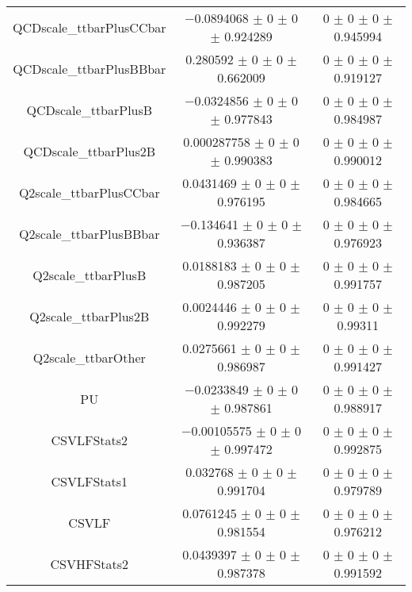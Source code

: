 \begin{table}
\begin{tabular}{ccc}
QCDscale\_ttbarPlusCCbar 	& \num{-0.0894068} $\pm$ \num{0} $\pm$ \num{0} $\pm$ \num{0.924289} 	& \num{0} $\pm$ \num{0} $\pm$ \num{0} $\pm$ \num{0.945994}\\
QCDscale\_ttbarPlusBBbar 	& \num{0.280592} $\pm$ \num{0} $\pm$ \num{0} $\pm$ \num{0.662009} 	& \num{0} $\pm$ \num{0} $\pm$ \num{0} $\pm$ \num{0.919127}\\
QCDscale\_ttbarPlusB 	& \num{-0.0324856} $\pm$ \num{0} $\pm$ \num{0} $\pm$ \num{0.977843} 	& \num{0} $\pm$ \num{0} $\pm$ \num{0} $\pm$ \num{0.984987}\\
QCDscale\_ttbarPlus2B 	& \num{0.000287758} $\pm$ \num{0} $\pm$ \num{0} $\pm$ \num{0.990383} 	& \num{0} $\pm$ \num{0} $\pm$ \num{0} $\pm$ \num{0.990012}\\
Q2scale\_ttbarPlusCCbar 	& \num{0.0431469} $\pm$ \num{0} $\pm$ \num{0} $\pm$ \num{0.976195} 	& \num{0} $\pm$ \num{0} $\pm$ \num{0} $\pm$ \num{0.984665}\\
Q2scale\_ttbarPlusBBbar 	& \num{-0.134641} $\pm$ \num{0} $\pm$ \num{0} $\pm$ \num{0.936387} 	& \num{0} $\pm$ \num{0} $\pm$ \num{0} $\pm$ \num{0.976923}\\
Q2scale\_ttbarPlusB 	& \num{0.0188183} $\pm$ \num{0} $\pm$ \num{0} $\pm$ \num{0.987205} 	& \num{0} $\pm$ \num{0} $\pm$ \num{0} $\pm$ \num{0.991757}\\
Q2scale\_ttbarPlus2B 	& \num{0.0024446} $\pm$ \num{0} $\pm$ \num{0} $\pm$ \num{0.992279} 	& \num{0} $\pm$ \num{0} $\pm$ \num{0} $\pm$ \num{0.99311}\\
Q2scale\_ttbarOther 	& \num{0.0275661} $\pm$ \num{0} $\pm$ \num{0} $\pm$ \num{0.986987} 	& \num{0} $\pm$ \num{0} $\pm$ \num{0} $\pm$ \num{0.991427}\\
PU 	& \num{-0.0233849} $\pm$ \num{0} $\pm$ \num{0} $\pm$ \num{0.987861} 	& \num{0} $\pm$ \num{0} $\pm$ \num{0} $\pm$ \num{0.988917}\\
CSVLFStats2 	& \num{-0.00105575} $\pm$ \num{0} $\pm$ \num{0} $\pm$ \num{0.997472} 	& \num{0} $\pm$ \num{0} $\pm$ \num{0} $\pm$ \num{0.992875}\\
CSVLFStats1 	& \num{0.032768} $\pm$ \num{0} $\pm$ \num{0} $\pm$ \num{0.991704} 	& \num{0} $\pm$ \num{0} $\pm$ \num{0} $\pm$ \num{0.979789}\\
CSVLF 	& \num{0.0761245} $\pm$ \num{0} $\pm$ \num{0} $\pm$ \num{0.981554} 	& \num{0} $\pm$ \num{0} $\pm$ \num{0} $\pm$ \num{0.976212}\\
CSVHFStats2 	& \num{0.0439397} $\pm$ \num{0} $\pm$ \num{0} $\pm$ \num{0.987378} 	& \num{0} $\pm$ \num{0} $\pm$ \num{0} $\pm$ \num{0.991592}\\

\end{tabular}
\end{table}
